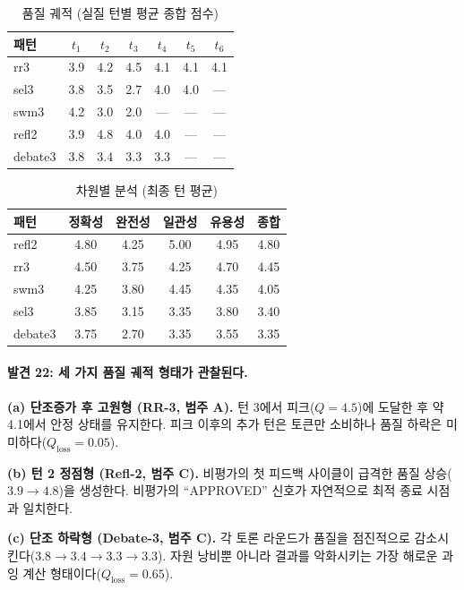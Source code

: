 \begin{table}[H]
\centering
\caption{품질 궤적 (실질 턴별 평균 종합 점수)}
\label{tab:quality-trajectory}
{\small
\begin{tabular}{lcccccc}
\toprule
패턴 & $t_1$ & $t_2$ & $t_3$ & $t_4$ & $t_5$ & $t_6$ \\
\midrule
rr3     & 3.9 & 4.2 & 4.5 & 4.1 & 4.1 & 4.1 \\
sel3    & 3.8 & 3.5 & 2.7 & 4.0 & 4.0 & --- \\
swm3    & 4.2 & 3.0 & 2.0 & --- & --- & --- \\
refl2   & 3.9 & 4.8 & 4.0 & 4.0 & --- & --- \\
debate3 & 3.8 & 3.4 & 3.3 & 3.3 & --- & --- \\
\bottomrule
\end{tabular}
}
\end{table}

\begin{table}[H]
\centering
\caption{차원별 분석 (최종 턴 평균)}
\label{tab:dimension-analysis}
{\small
\begin{tabular}{lccccc}
\toprule
패턴 & 정확성 & 완전성 & 일관성 & 유용성 & 종합 \\
\midrule
refl2   & 4.80 & 4.25 & 5.00 & 4.95 & 4.80 \\
rr3     & 4.50 & 3.75 & 4.25 & 4.70 & 4.45 \\
swm3    & 4.25 & 3.80 & 4.45 & 4.35 & 4.05 \\
sel3    & 3.85 & 3.15 & 3.35 & 3.80 & 3.40 \\
debate3 & 3.75 & 2.70 & 3.35 & 3.55 & 3.35 \\
\bottomrule
\end{tabular}
}
\end{table}

\paragraph{발견 22: 세 가지 품질 궤적 형태가 관찰된다.}

\textbf{(a) 단조증가 후 고원형 (RR-3, 범주 A).} 턴 3에서 피크($Q=4.5$)에 도달한 후 약 4.1에서 안정 상태를 유지한다. 피크 이후의 추가 턴은 토큰만 소비하나 품질 하락은 미미하다($Q_{\text{loss}}=0.05$).

\textbf{(b) 턴 2 정점형 (Refl-2, 범주 C).} 비평가의 첫 피드백 사이클이 급격한 품질 상승($3.9 \to 4.8$)을 생성한다. 비평가의 ``APPROVED'' 신호가 자연적으로 최적 종료 시점과 일치한다.

\textbf{(c) 단조 하락형 (Debate-3, 범주 C).} 각 토론 라운드가 품질을 점진적으로 감소시킨다($3.8 \to 3.4 \to 3.3 \to 3.3$). 자원 낭비뿐 아니라 결과를 악화시키는 가장 해로운 과잉 계산 형태이다($Q_{\text{loss}}=0.65$).

